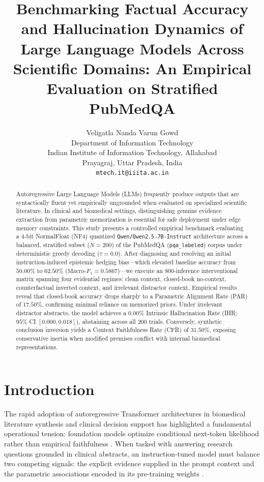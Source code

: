 \documentclass[10pt,twocolumn,letterpaper]{article}
\title{\textbf{Benchmarking Factual Accuracy and Hallucination Dynamics of Large Language Models Across Scientific Domains: An Empirical Evaluation on Stratified PubMedQA}}
\author{
  Veligatla Nanda Varun Gowd \\
  Department of Information Technology \\
  Indian Institute of Information Technology, Allahabad \\
  Prayagraj, Uttar Pradesh, India \\
  \texttt{mtech.it@iiita.ac.in}
}
\date{}
\begin{document}
\maketitle

\begin{abstract}
Autoregressive Large Language Models (LLMs) frequently produce outputs that are syntactically fluent yet empirically ungrounded when evaluated on specialized scientific literature. In clinical and biomedical settings, distinguishing genuine evidence extraction from parametric memorization is essential for safe deployment under edge memory constraints. This study presents a controlled empirical benchmark evaluating a 4-bit NormalFloat (NF4) quantized \texttt{Qwen/Qwen2.5-7B-Instruct} architecture across a balanced, stratified subset ($N=200$) of the PubMedQA (\texttt{pqa\_labeled}) corpus under deterministic greedy decoding ($\tau = 0.0$). After diagnosing and resolving an initial instruction-induced epistemic hedging bias—which elevated baseline accuracy from $50.00\%$ to $62.50\%$ ($\text{Macro-}F_1 = 0.5867$)—we execute an $800$-inference interventional matrix spanning four evidential regimes: clean context, closed-book no-context, counterfactual inverted context, and irrelevant distractor context. Empirical results reveal that closed-book accuracy drops sharply to a Parametric Alignment Rate (PAR) of $17.50\%$, confirming minimal reliance on memorized priors. Under irrelevant distractor abstracts, the model achieves a $0.00\%$ Intrinsic Hallucination Rate (IHR; $95\%$ CI $[0.000, 0.018]$), abstaining across all $200$ trials. Conversely, synthetic conclusion inversion yields a Context Faithfulness Rate (CFR) of $31.50\%$, exposing conservative inertia when modified premises conflict with internal biomedical representations.
\end{abstract}

\section{Introduction}
The rapid adoption of autoregressive Transformer architectures in biomedical literature synthesis and clinical decision support has highlighted a fundamental operational tension: foundation models optimize conditional next-token likelihood rather than empirical faithfulness \cite{huang2023survey,rawte2023survey}. When tasked with answering research questions grounded in clinical abstracts, an instruction-tuned model must balance two competing signals: the explicit evidence supplied in the prompt context and the parametric associations encoded in its pre-training weights \cite{ji2023survey}.
\end{document}

